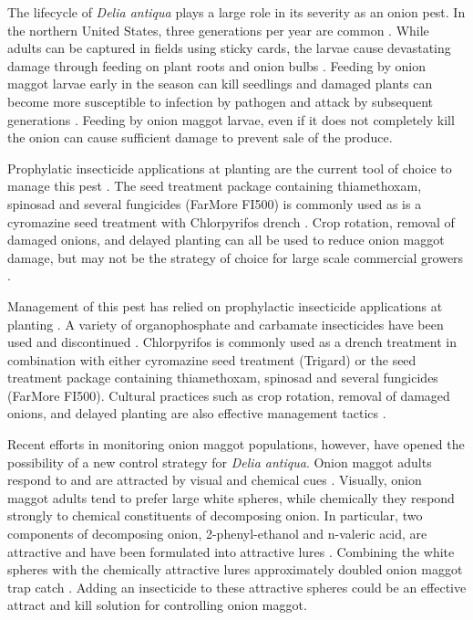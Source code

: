 \documentclass[alpha-refs]{wiley-article}
\begin{document}
The lifecycle of \textit{Delia antiqua} plays a large role in its severity as an onion pest.  In the northern United States, three generations per year are common \citep{eckenrode1975population, hoepting2004insecticide}.  While adults can be captured in fields using sticky cards, the larvae cause devastating damage through feeding on plant roots and onion bulbs \citep{nault2006onion, nault2006performance}. Feeding by onion maggot larvae early in the season can kill seedlings and damaged plants can become more susceptible to infection by pathogen and attack by subsequent generations \citep{eckenrode1986impact,nault2006performance}.  Feeding by onion maggot larvae, even if it does not completely kill the onion can cause sufficient damage to prevent sale of the produce.   

Prophylatic insecticide applications at planting are the current tool of choice to manage this pest \citep{nault2006performance}.  The seed treatment package containing thiamethoxam, spinosad and several fungicides (FarMore FI500) is commonly used as is a cyromazine seed treatment with Chlorpyrifos drench \citep{nault2006performance}.  Crop rotation, removal of damaged onions, and delayed planting can all be used to reduce onion maggot damage, but may not be the strategy of choice for large scale commercial growers \citep{martinson1988dispersal, finch1985influence, nault2011delaying}.   

Management of this pest has relied on prophylactic insecticide applications at planting \citep{nault2006performance}.  A variety of organophosphate and carbamate insecticides have been used and discontinued \citep{nault2006performance}.  Chlorpyrifos is commonly used as a drench treatment in combination with either cyromazine seed treatment (Trigard)  \citep{nault2006performance} or the seed treatment package containing thiamethoxam, spinosad and several fungicides (FarMore FI500).  Cultural practices such as crop rotation, removal of damaged onions, and delayed planting are also effective management tactics \citep{martinson1988dispersal, finch1985influence, nault2011delaying}.  

Recent efforts in monitoring onion maggot populations, however, have opened the possibility of a new control strategy for \textit{Delia antiqua}.  Onion maggot adults respond to and are attracted by visual and chemical cues \citep{harris1983color,harris1988host, thomingdeveloping, otto2000development}.  Visually, onion maggot adults tend to prefer large white spheres, while chemically they respond strongly to chemical constituents of decomposing onion.  In particular, two components of decomposing onion, 2-phenyl-ethanol and n-valeric acid, are attractive and have been formulated into attractive lures \citep{ishikawa1984mixture,ishikawa1987controlled, kuhar2006field}.  Combining the white spheres with the chemically attractive lures approximately doubled onion maggot trap catch \citep{willett2019}.  Adding an insecticide to these attractive spheres could be an effective attract and kill solution for controlling onion maggot.  
\end{document}
